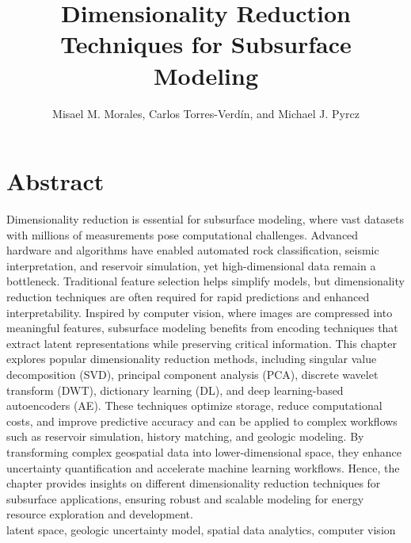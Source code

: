 \documentclass[a4paper,fleqn,12pt]{article}
\title{Dimensionality Reduction Techniques for Subsurface Modeling}
\author{Misael M. Morales, Carlos Torres-Verd\'{i}n, and Michael J. Pyrcz}
\begin{document}
\newcommand*{\vertbar}{\rule[-1ex]{0.5pt}{2.5ex}}
\maketitle
\linenumbers

\section*{Abstract}
Dimensionality reduction is essential for subsurface modeling, where vast datasets with millions of measurements pose computational challenges. Advanced hardware and algorithms have enabled automated rock classification, seismic interpretation, and reservoir simulation, yet high-dimensional data remain a bottleneck. Traditional feature selection helps simplify models, but dimensionality reduction techniques are often required for rapid predictions and enhanced interpretability. Inspired by computer vision, where images are compressed into meaningful features, subsurface modeling benefits from encoding techniques that extract latent representations while preserving critical information. This chapter explores popular dimensionality reduction methods, including singular value decomposition (SVD), principal component analysis (PCA), discrete wavelet transform (DWT), dictionary learning (DL), and deep learning-based autoencoders (AE). These techniques optimize storage, reduce computational costs, and improve predictive accuracy and can be applied to complex workflows such as reservoir simulation, history matching, and geologic modeling. By transforming complex geospatial data into lower-dimensional space, they enhance uncertainty quantification and accelerate machine learning workflows. Hence, the chapter provides insights on different dimensionality reduction techniques for subsurface applications, ensuring robust and scalable modeling for energy resource exploration and development.\\

 latent space, geologic uncertainty model, spatial data analytics, computer vision

\end{document}
